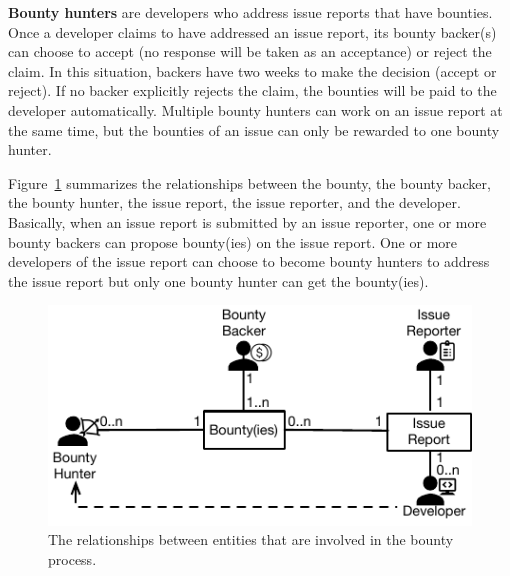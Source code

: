 \noindent\textbf{Bounty hunters} are developers who address issue reports that have bounties. Once a developer claims to have addressed an issue report, its bounty backer(s) can choose to accept (no response will be taken as an acceptance) or reject the claim. In this situation, backers have two weeks to make the decision (accept or reject). If no backer explicitly rejects the claim, the bounties will be paid to the developer automatically.
Multiple bounty hunters can work on an issue report at the same time, but the bounties of an issue can only be rewarded to one bounty hunter.






Figure~\ref{RelationEntity} summarizes the relationships between the bounty, the bounty backer, the bounty hunter, the issue report, the issue reporter, and the developer. Basically, when an issue report is submitted by an issue reporter, one or more bounty backers can propose bounty(ies) on the issue report. One or more developers of the issue report can choose to become bounty hunters to address the issue report but only one bounty hunter can get the bounty(ies).




\begin{figure}[t]
   \centering\includegraphics{pics/bg/RelationEntity}
      \vspace{-0.1in}
  \caption{The relationships between entities that are involved in the  bounty process.}
  \label{RelationEntity}
  \vspace{-0.1in}

\end{figure}



